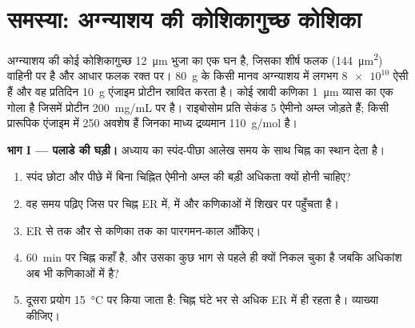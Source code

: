 \section{समस्या: अग्न्याशय की कोशिकागुच्छ कोशिका}

\begin{problem}
\label{pb:b1:eukaryotic-cell:1}
अग्न्याशय की कोई कोशिकागुच्छ  \qty{12}{\micro m} भुजा का एक घन है,
जिसका शीर्ष फलक (\qty{144}{\micro m^2}) वाहिनी पर है और आधार फलक रक्त
पर। \qty{80}{g} के किसी मानव अग्न्याशय में लगभग $\num{8e10}$ ऐसी
 हैं और वह प्रतिदिन \qty{10}{g} एंजाइम प्रोटीन स्रावित करता है।
कोई स्रावी कणिका \qty{1}{\micro m} व्यास का एक गोला है जिसमें प्रोटीन
\qty{200}{mg/mL} पर है। राइबोसोम प्रति सेकंड \qty{5}{} ऐमीनो अम्ल जोड़ते
हैं; किसी प्रारूपिक एंजाइम में \qty{250}{} अवशेष हैं जिनका माध्य
द्रव्यमान \qty{110}{g/mol} है।

\medskip
\noindent\textbf{भाग I --- पलाडे की घड़ी।}
अध्याय का स्पंद-पीछा आलेख समय के साथ चिह्न का स्थान देता है।
\begin{enumerate}
  \item स्पंद छोटा और पीछे में बिना चिह्नित ऐमीनो अम्ल की बड़ी अधिकता
        क्यों होनी चाहिए?
  \item वह समय पढ़िए जिस पर चिह्न ER में,  में और कणिकाओं में
        शिखर पर पहुँचता है।
  \item ER से  तक और  से कणिका तक का पारगमन-काल आँकिए।
  \item \qty{60}{min} पर चिह्न कहाँ है, और उसका कुछ भाग  से पहले
        ही क्यों निकल चुका है जबकि अधिकांश अब भी कणिकाओं में है?
  \item दूसरा प्रयोग \qty{15}{\celsius} पर किया जाता है: चिह्न घंटे भर
        से अधिक ER में ही रहता है। व्याख्या कीजिए।
\end{enumerate}


\end{problem}
